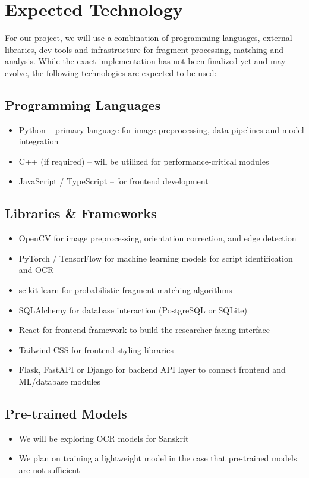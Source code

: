 \documentclass{article}
\begin{document}
\section{Expected Technology}

\noindent For our project, we will use a combination of programming languages, external libraries, dev tools and infrastructure for fragment processing, matching and analysis. While the exact implementation has not been finalized yet and may evolve, the following technologies are expected to be used:

\subsection*{Programming Languages}
\begin{itemize}
    \item Python -- primary language for image preprocessing, data pipelines and model integration
    \item C++ (if required) -- will be utilized for performance-critical modules
    \item JavaScript / TypeScript -- for frontend development
\end{itemize}

\subsection*{Libraries \& Frameworks}
\begin{itemize}
    \item OpenCV for image preprocessing, orientation correction, and edge detection
    \item PyTorch / TensorFlow for machine learning models for script identification and OCR
    \item scikit-learn for probabilistic fragment-matching algorithms
    \item SQLAlchemy for database interaction (PostgreSQL or SQLite)
    \item React for frontend framework to build the researcher-facing interface
    \item Tailwind CSS for frontend styling libraries
    \item Flask, FastAPI or Django for backend API layer to connect frontend and ML/database modules
\end{itemize}

\subsection*{Pre-trained Models}
\begin{itemize}
    \item We will be exploring OCR models for Sanskrit
    \item We plan on training a lightweight model in the case that pre-trained models are not sufficient
\end{itemize}
\end{document}
